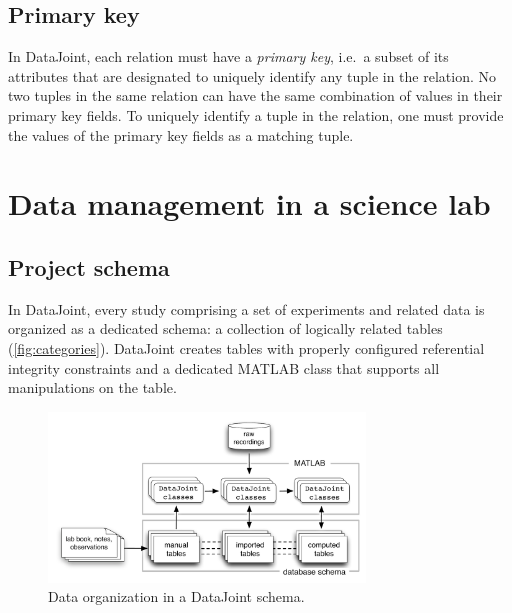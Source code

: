 \documentclass[10pt]{article}
\begin{document}
\subsection{Primary key}
In DataJoint, each relation must have a {\em primary key}, i.e.~a subset of its attributes that are designated to uniquely identify any tuple in the relation. No two tuples in the same relation can have the same combination of values in their primary key fields.  To uniquely identify a tuple in the relation, one must provide the values of the primary key fields as a matching tuple. 

\newpage\section{Data management in a science lab}
\subsection{Project schema}
In DataJoint, every study comprising a set of experiments and related data is organized as a dedicated schema: a collection of logically related tables (\autoref{fig:categories}).  DataJoint creates tables with properly configured referential integrity constraints and a dedicated MATLAB class that supports all manipulations on the table.

\begin{figure}[htb]
\center
\includegraphics[width=0.75\textwidth]{categories.pdf}
\caption{Data organization in a DataJoint schema.}
\label{fig:categories}
\end{figure} 
 
\end{document}
